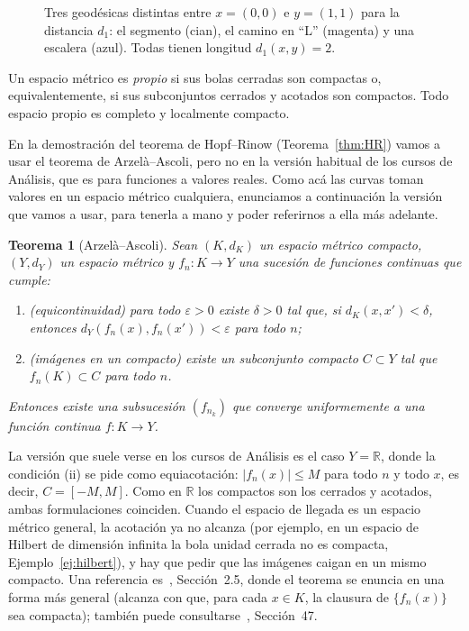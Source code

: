 \documentclass[12pt, a4paper]{amsart}
\newtheorem{teorema}{Teorema}[section]
\theoremstyle{definition}
\theoremstyle{remark}
\begin{document}
\begin{figure}[htbp]
\centering
{}
\caption{Tres geodésicas distintas entre $x=(0,0)$ e $y=(1,1)$ para la distancia $d_1$: el segmento (cian), el camino en ``L'' (magenta) y una escalera (azul). Todas tienen longitud $d_1(x,y)=2$.}
\label{fig:l1}
\end{figure}

Un espacio métrico es \emph{propio} si sus bolas cerradas son compactas o, equivalentemente, si sus subconjuntos cerrados y acotados son compactos. Todo espacio propio es completo y localmente compacto.

En la demostración del teorema de Hopf--Rinow (Teorema~\ref{thm:HR}) vamos a usar el teorema de Arzelà--Ascoli, pero no en la versión habitual de los cursos de Análisis, que es para funciones a valores reales. Como acá las curvas toman valores en un espacio métrico cualquiera, enunciamos a continuación la versión que vamos a usar, para tenerla a mano y poder referirnos a ella más adelante.

\begin{teorema}[Arzelà--Ascoli]\label{thm:AA}
Sean $(K,d_K)$ un espacio métrico compacto, $(Y,d_Y)$ un espacio métrico y $f_n\colon K\to Y$ una sucesión de funciones continuas que cumple:
\begin{enumerate}[label=(\roman*)]
\item (\emph{equicontinuidad}) para todo $\varepsilon>0$ existe $\delta>0$ tal que, si $d_K(x,x')<\delta$, entonces $d_Y(f_n(x),f_n(x'))<\varepsilon$ para todo $n$;
\item (\emph{imágenes en un compacto}) existe un subconjunto compacto $C\subset Y$ tal que $f_n(K)\subset C$ para todo $n$.
\end{enumerate}
Entonces existe una subsucesión $(f_{n_k})$ que converge uniformemente a una función continua $f\colon K\to Y$.
\end{teorema}

La versión que suele verse en los cursos de Análisis es el caso $Y=\mathbb R$, donde la condición (ii) se pide como equiacotación: $|f_n(x)|\le M$ para todo $n$ y todo $x$, es decir, $C=[-M,M]$. Como en $\mathbb R$ los compactos son los cerrados y acotados, ambas formulaciones coinciden. Cuando el espacio de llegada es un espacio métrico general, la acotación ya no alcanza (por ejemplo, en un espacio de Hilbert de dimensión infinita la bola unidad cerrada no es compacta, Ejemplo~\ref{ej:hilbert}), y hay que pedir que las imágenes caigan en un mismo compacto. Una referencia es~\cite{BBI}, Sección~2.5, donde el teorema se enuncia en una forma más general (alcanza con que, para cada $x\in K$, la clausura de $\{f_n(x)\}$ sea compacta); también puede consultarse~\cite{Munkres}, Sección~47.
\end{document}
